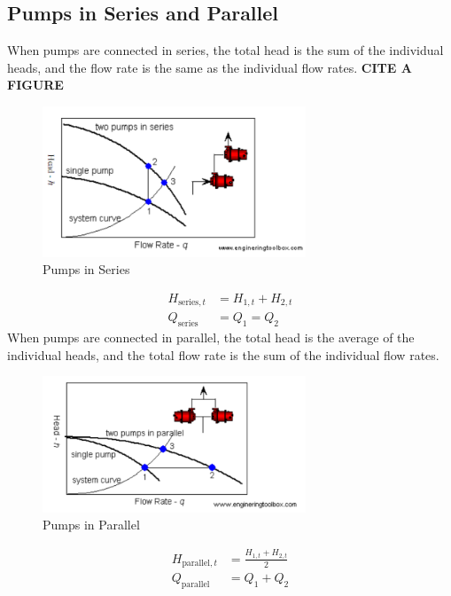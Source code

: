 \subsection{Pumps in Series and Parallel}
When pumps are connected in series, the total head is the sum of the individual heads, and the flow rate is the same as the individual flow rates. \textbf{CITE A FIGURE}
\begin{figure}[h]
    \centering
    \includegraphics[width=0.7\textwidth]{Sections/Figures/pump in series.png}
    \caption{Pumps in Series}
    \label{fig:series}
\end{figure}
\begin{align}
    H_{\text{series}, t} &= H_{1,t} + H_{2,t} \label{eq:series_head}  \\
    Q_{\text{series}} &= Q_1 = Q_2 \label{eq:series_flow}
\end{align} 
When pumps are connected in parallel, the total head is the average of the individual heads, and the total flow rate is the sum of the individual flow rates.
\begin{figure}[h]
    \centering
    \includegraphics[width=0.7\textwidth]{Sections/Figures/pump in parallel.png}
    \caption{Pumps in Parallel}
    \label{fig:parallel}
\end{figure}
\begin{align}
    H_{\text{parallel}, t} &= \frac{H_{1,t} + H_{2,t}}{2} \label{eq:parallel_head} \\
    Q_{\text{parallel}} &= Q_1 + Q_2 \label{eq:parallel_flow}
\end{align}